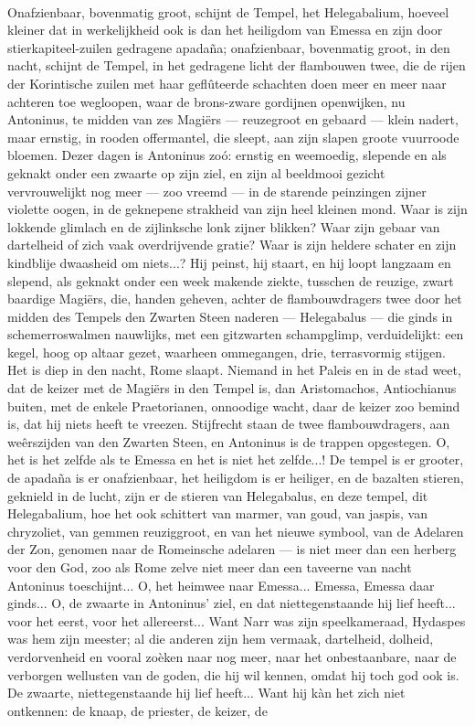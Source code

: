 \documentclass[a4paper, 12pt, oneside, dutch]{article}
\begin{document}
\paragraph{}
Onafzienbaar, bovenmatig groot, schijnt de Tempel, het Helegabalium, hoeveel kleiner dat in werkelijkheid ook is dan het heiligdom van Emessa en zijn door stierkapiteel-zuilen gedragene apadaña; onafzienbaar, bovenmatig groot, in den nacht, schijnt de Tempel, in het gedragene licht der flambouwen twee, die de rijen der Korintische zuilen met haar geflûteerde schachten doen meer en meer naar achteren toe wegloopen, waar de brons-zware gordijnen openwijken, nu Antoninus, te midden van zes Magiërs --- reuzegroot en gebaard --- klein nadert, maar ernstig, in rooden offermantel, die sleept, aan zijn slapen groote vuurroode bloemen. Dezer dagen is Antoninus zoó: ernstig en weemoedig, slepende en als geknakt onder een zwaarte op zijn ziel, en zijn al beeldmooi gezicht vervrouwelijkt nog meer --- zoo vreemd --- in de starende peinzingen zijner violette oogen, in de geknepene strakheid van zijn heel kleinen mond. Waar is zijn lokkende glimlach en de zijlinksche lonk zijner blikken? Waar zijn gebaar van dartelheid of zich vaak overdrijvende gratie? Waar is zijn heldere schater en zijn kindblije dwaasheid om niets...? Hij peinst, hij staart, en hij loopt langzaam en slepend, als geknakt onder een week makende ziekte, tusschen de reuzige, zwart baardige Magiërs, die, handen geheven, achter de flambouwdragers twee door het midden des Tempels den Zwarten Steen naderen --- Helegabalus --- die ginds in schemerroswalmen nauwlijks, met een gitzwarten schampglimp, verduidelijkt: een kegel, hoog op altaar gezet, waarheen ommegangen, drie, terrasvormig stijgen. Het is diep in den nacht, Rome slaapt. Niemand in het Paleis en in de stad weet, dat de keizer met de Magiërs in den Tempel is, dan Aristomachos, Antiochianus buiten, met de enkele Praetorianen, onnoodige wacht, daar de keizer zoo bemind is, dat hij niets heeft te vreezen. Stijfrecht staan de twee flambouwdragers, aan weêrszijden van den Zwarten Steen, en Antoninus is de trappen opgestegen. O, het is het zelfde als te Emessa en het is niet het zelfde...! De tempel is er grooter, de apadaña is er onafzienbaar, het heiligdom is er heiliger, en de bazalten stieren, geknield in de lucht, zijn er de stieren van Helegabalus, en deze tempel, dit Helegabalium, hoe het ook schittert van marmer, van goud, van jaspis, van chryzoliet, van gemmen reuziggroot, en van het nieuwe symbool, van de Adelaren der Zon, genomen naar de Romeinsche adelaren --- is niet meer dan een herberg voor den God, zoo als Rome zelve niet meer dan een taveerne van nacht Antoninus toeschijnt... O, het heimwee naar Emessa... Emessa, Emessa daar ginds... O, de zwaarte in Antoninus' ziel, en dat niettegenstaande hij lief heeft... voor het eerst, voor het allereerst... Want Narr was zijn speelkameraad, Hydaspes was hem zijn meester; al die anderen zijn hem vermaak, dartelheid, dolheid, verdorvenheid en vooral zoèken naar nog meer, naar het onbestaanbare, naar de verborgen wellusten van de goden, die hij wil kennen, omdat hij toch god ook is. De zwaarte, niettegenstaande hij lief heeft... Want hij kàn het zich niet ontkennen: de knaap, de priester, de keizer, de 
\end{document}
